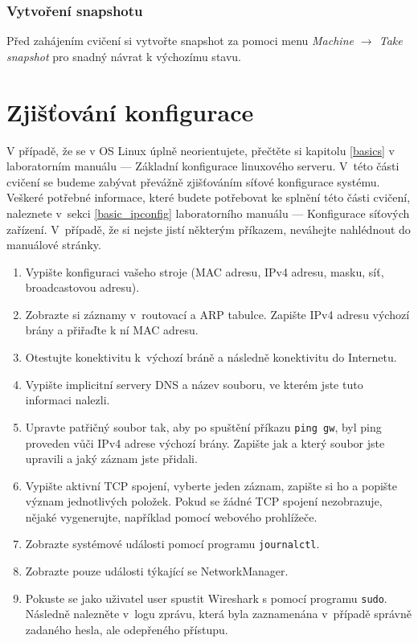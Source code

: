 \subsubsection*{Vytvoření snapshotu}
Před zahájením cvičení si vytvořte snapshot za pomoci menu \textit{Machine $\rightarrow$ Take snapshot} pro snadný návrat k výchozímu stavu.

\section{Zjišťování konfigurace}
V případě, že se v OS Linux úplně neorientujete, přečtěte si kapitolu \ref{basics} v
laboratorním manuálu --- Základní konfigurace linuxového serveru. V~této části cvičení se
budeme zabývat převážně zjišťováním síťové konfigurace systému. Veškeré potřebné
informace, které budete potřebovat ke splnění této části cvičení, naleznete
v~sekci \ref{basic_ipconfig} laboratorního manuálu --- Konfigurace síťových zařízení. V~případě, že si nejste jistí některým příkazem, neváhejte nahlédnout do manuálové stránky.

\begin{enumerate}
\item Vypište konfiguraci vašeho stroje (MAC adresu, IPv4 adresu, masku, síť, broadcastovou adresu).
\item Zobrazte si záznamy v~routovací a ARP tabulce. Zapište IPv4 adresu výchozí brány a přiřaďte k ní MAC adresu.
\item Otestujte konektivitu k~výchozí bráně a následně konektivitu do Internetu.
\item Vypište implicitní servery DNS a název souboru, ve kterém jste tuto informaci nalezli.
\item Upravte patřičný soubor tak, aby po spuštění příkazu \texttt{ping gw}, byl ping proveden vůči IPv4 adrese výchozí brány. Zapište jak a který soubor jste upravili a jaký záznam jste přidali.
\item Vypište aktivní TCP spojení, vyberte jeden záznam, zapište si ho a popište význam jednotlivých položek. Pokud se žádné TCP spojení nezobrazuje, nějaké vygenerujte, například pomocí webového prohlížeče.
\item Zobrazte systémové události pomocí programu \texttt{journalctl}.
\item Zobrazte pouze události týkající se NetworkManager.
\item Pokuste se jako uživatel user spustit Wireshark s pomocí programu \texttt{sudo}. Následně nalezněte v~logu zprávu, která byla zaznamenána v~případě správně zadaného hesla, ale odepřeného přístupu.
\end{enumerate}


